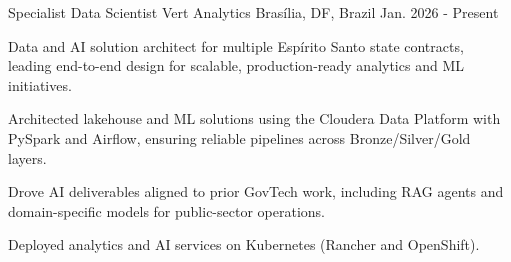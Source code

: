 

\begin{cventries}

  \cventry
    {Specialist Data Scientist} %
    {Vert Analytics} %
    {Brasília, DF, Brazil} %
    {Jan. 2026 - Present} %
    {
      \begin{cvitems} %
        \item {Data and AI solution architect for multiple Espírito Santo state contracts, leading end-to-end design for scalable, production-ready analytics and ML initiatives.}
        \item {Architected lakehouse and ML solutions using the Cloudera Data Platform with PySpark and Airflow, ensuring reliable pipelines across Bronze/Silver/Gold layers.}
        \item {Drove AI deliverables aligned to prior GovTech work, including RAG agents and domain-specific models for public-sector operations.}
        \item {Deployed analytics and AI services on Kubernetes (Rancher and OpenShift).}
      \end{cvitems}
    }


\end{cventries}
